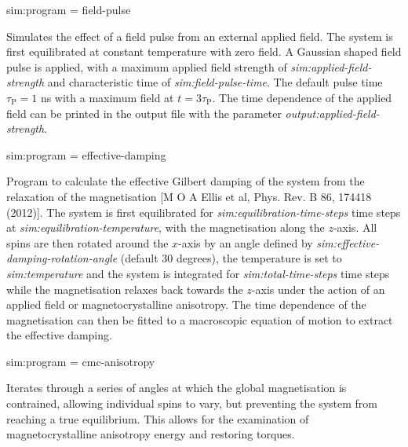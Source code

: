 {\zicf sim:program = field-pulse}
Simulates the effect of a field pulse from an external applied field. The
system is first equilibrated at constant temperature with zero field. A
Gaussian shaped field pulse is applied, with a maximum applied field strength of
\textit{sim:applied-field-strength} and characteristic time of
\textit{sim:field-pulse-time}. The default pulse time $\tau_\mathrm{P} = 1$ ns
with a maximum field at $t = 3\tau_\mathrm{P}$. The time dependence of the
applied field can be printed in the output file with the parameter
\textit{output:applied-field-strength}.

{\zicf sim:program = effective-damping}
Program to calculate the effective Gilbert damping of the system from the
relaxation of the magnetisation [M O A Ellis et al, Phys. Rev. B 86, 174418 (2012)].
The system is first equilibrated for \textit{sim:equilibration-time-steps} time
steps at \textit{sim:equilibration-temperature}, with the magnetisation along
the $z$-axis. All spins are then rotated around the $x$-axis by an angle
defined by \textit{sim:effective-damping-rotation-angle} (default 30 degrees),
the temperature is set to \textit{sim:temperature} and the system is integrated
for \textit{sim:total-time-steps} time steps while the magnetisation relaxes
back towards the $z$-axis under the action of an applied field or
magnetocrystalline anisotropy. The time dependence of the magnetisation can
then be fitted to a macroscopic equation of motion to extract the effective
damping.

{\zicf sim:program = cmc-anisotropy} Iterates through a series of angles at which the global magnetisation is contrained, allowing individual spins to vary, but preventing the system from reaching a true equilibrium. This allows for the examination of magnetocrystalline anisotropy energy and restoring torques.

